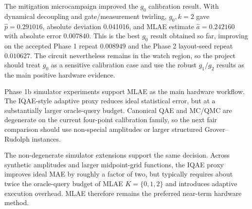 The mitigation microcampaign improved the \(g_0\) calibration result. With
dynamical decoupling and gate/measurement twirling, \(g_0,k=2\) gave
\(\hat{p}=0.291016\), absolute deviation 0.041016, and MLAE estimate
\(\hat{a}=0.242160\) with absolute error 0.007840. This is the best \(g_0\)
result obtained so far, improving on the accepted Phase 1 repeat
\(0.008949\) and the Phase 2 layout-seed repeat \(0.010627\). The circuit
nevertheless remains in the watch region, so the project should treat \(g_0\) as
a sensitive calibration case and use the robust \(g_1/g_2\) results as the main
positive hardware evidence.

Phase 1b simulator experiments support MLAE as the main hardware workflow. The
IQAE-style adaptive proxy reduces ideal statistical error, but at a substantially
larger oracle-query budget. Canonical QAE and MC/QMC are degenerate on the
current four-point calibration family, so the next fair comparison should use
non-special amplitudes or larger structured Grover--Rudolph instances.

The non-degenerate simulator extensions support the same decision. Across
synthetic amplitudes and larger midpoint-grid functions, the IQAE proxy improves
ideal MAE by roughly a factor of two, but typically requires about twice the
oracle-query budget of MLAE \(K=\{0,1,2\}\) and introduces adaptive execution
overhead. MLAE therefore remains the preferred near-term hardware method.

